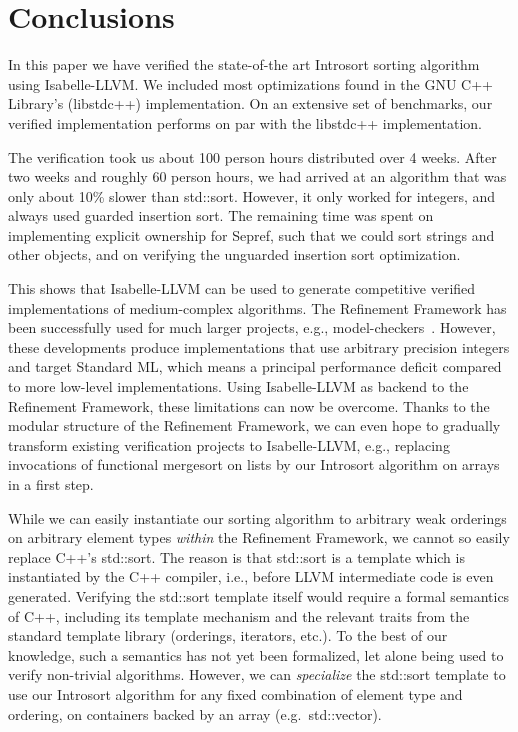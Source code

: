 \documentclass[sigplan,10pt,anonymous,review]{acmart}\settopmatter{printfolios=true,printccs=false,printacmref=false}
\theoremstyle{definition}
\begin{document}
\section{Conclusions}
In this paper we have verified the state-of-the art Introsort sorting algorithm using Isabelle-LLVM.
We included most optimizations found in the GNU C++ Library's (libstdc++) implementation.
On an extensive set of benchmarks, our verified implementation performs on par with the libstdc++ implementation.

The verification took us about 100 person hours distributed over 4 weeks. After two weeks and roughly 60 person hours,
we had arrived at an algorithm that was only about 10\% slower than std::sort. However, it only worked for integers, and always
used guarded insertion sort. The remaining time was spent on implementing explicit ownership for Sepref, such
that we could sort strings and other objects, and on verifying the unguarded insertion sort optimization.




This shows that Isabelle-LLVM can be used to generate competitive verified implementations of medium-complex algorithms.
The Refinement Framework has been successfully used for much larger projects, e.g., model-checkers~\cite{ELNN13,BrLa18,WiLa18}.
However, these developments produce implementations that use arbitrary precision integers and target Standard ML,
which means a principal performance deficit compared to more low-level implementations. Using Isabelle-LLVM as backend to the Refinement Framework,
these limitations can now be overcome. Thanks to the modular structure of the Refinement Framework, we can even hope to gradually
transform existing verification projects to Isabelle-LLVM, e.g., replacing invocations of functional mergesort on lists by
our Introsort algorithm on arrays in a first step.

While we can easily instantiate our sorting algorithm to arbitrary weak orderings on arbitrary element types \emph{within} the Refinement Framework,
we cannot so easily replace C++'s std::sort. The reason is that std::sort is a template which is instantiated by the C++ compiler,
i.e., before LLVM intermediate code is even generated. Verifying the std::sort template itself would require a formal semantics of C++,
including its template mechanism and the relevant traits from the standard template library (orderings, iterators, etc.). To the best of our knowledge, such a semantics has not yet been formalized, let alone being used to verify non-trivial algorithms.
However, we can \emph{specialize} the std::sort template to use our Introsort algorithm for any fixed combination of element type and ordering, on containers backed by an array (e.g.\ std::vector).
\end{document}
